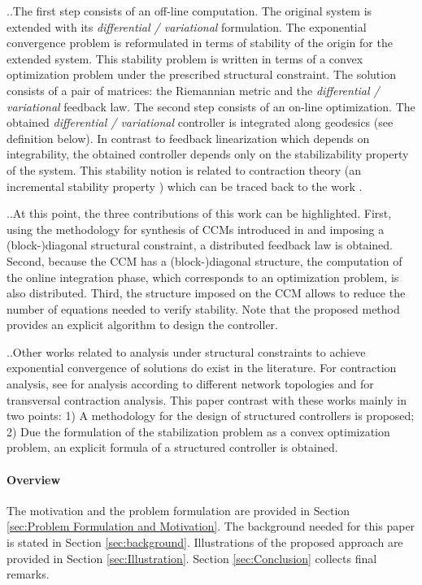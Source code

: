 \documentclass[10pt,twocolumn,twoside]{IEEEtran}
\newcounter{para}
\newcommand\mypara{\par \thesection.\refstepcounter{para}\thepara.\space}
\theoremstyle{plain}
\theoremstyle{definition}
\theoremstyle{remark}
\begin{document}
\mypara The first step consists of an off-line computation. The original system is extended with its \emph{differential / variational} formulation. The exponential convergence problem is reformulated in terms of stability of the origin for the extended system. This stability problem is written in terms of a convex optimization problem under the prescribed structural constraint. The solution consists of a pair of matrices: the Riemannian metric and the \emph{differential / variational} feedback law. The second step consists of an on-line optimization. The obtained \emph{differential / variational} controller is integrated along geodesics (see definition below).  In contrast to feedback linearization which depends on integrability, the obtained controller depends only on the stabilizability property of the system. This stability notion is related to contraction theory (an incremental stability property \cite{Angeli2002,Lohmiller1998,Rueffer2013,Sontag2010,Forni2014}) which can be traced back to the work \cite{Lewis1949}.

\mypara At this point, the three contributions of this work can be highlighted. First, using the methodology for synthesis of CCMs introduced in \cite{Manchester2014a} and imposing a (block-)diagonal structural constraint, a distributed feedback law is obtained. Second, because the CCM has a (block-)diagonal structure, the computation of the online integration phase, which corresponds to an optimization problem, is also distributed. Third, the structure imposed on the CCM allows to reduce the number of equations needed to  verify stability. Note that the proposed method provides an explicit algorithm to design the controller.

\mypara Other works related to analysis under structural constraints to achieve exponential convergence of solutions do exist in the literature. For contraction analysis, see \cite{Aminzare2014a} for analysis according to different network topologies and \cite{Andrieu2016} for transversal contraction analysis. This paper contrast with these works mainly in two points: 1) A  methodology for the design of structured controllers is proposed; 2) Due the formulation of the stabilization problem as a convex optimization problem, an explicit formula of a structured controller is obtained.

\paragraph{Overview} The motivation and the problem formulation are provided in Section \ref{sec:Problem Formulation and Motivation}. The background needed for this paper is stated in Section \ref{sec:background}. Illustrations of the proposed approach are provided in Section \ref{sec:Illustration}. Section \ref{sec:Conclusion} collects final remarks.
\end{document}
